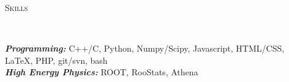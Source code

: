 \documentclass[9pt]{article}
\newenvironment{changemargin}[2]{%
  \begin{list}{}{%
    \setlength{\topsep}{0pt}%
    \setlength{\leftmargin}{#1}%
    \setlength{\rightmargin}{#2}%
    \setlength{\listparindent}{\parindent}%
    \setlength{\itemindent}{\parindent}%
    \setlength{\parsep}{\parskip}%
  }%
  \item[]}{\end{list}
}
\newcommand{\lineover}{
	\begin{changemargin}{-0.05in}{-0.05in}
		\vspace*{-8pt}
		\hrulefill \\
		\vspace*{-2pt}
	\end{changemargin}
}
\newcommand{\header}[1]{
	\begin{changemargin}{-0.5in}{-0.5in}
		\scshape{#1}\\
  	\lineover
	\end{changemargin}
}
\newenvironment{body} {
	\vspace*{-16pt}
	\begin{changemargin}{-0.25in}{-0.5in}
  }	
	{\end{changemargin}
}
\begin{document}
\smallskip



\header{Skills}

\begin{body}
	\vspace{14pt}
	\emph{\textbf{Programming:}}{} C++/C, Python, Numpy/Scipy, Javascript, HTML/CSS, \LaTeX, PHP, git/svn, bash \\
	\emph{\textbf{High Energy Physics:}}{} ROOT, RooStats, Athena\\
\end{body}

\smallskip
\end{document}
